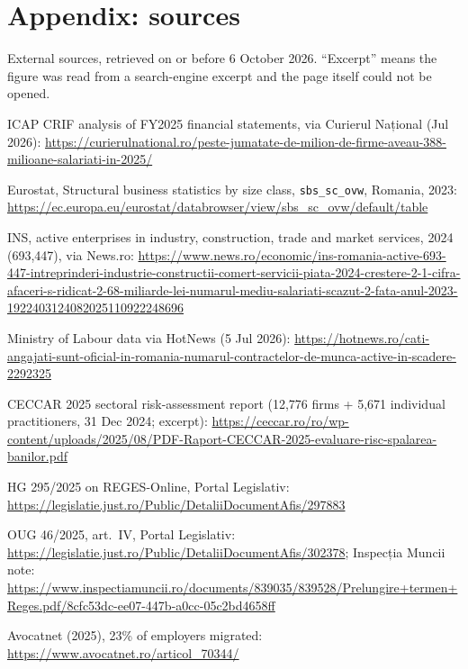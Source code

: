 \documentclass[10pt,a4paper]{article}
\begin{document}
\appendix
\section*{Appendix: sources}

{\scriptsize
External sources, retrieved on or before 6 October 2026. ``Excerpt'' means the figure was read from a
search-engine excerpt and the page itself could not be opened.

\begin{enumerate}[label={[\arabic*]},leftmargin=2.2em,itemsep=1.5pt]
\item ICAP CRIF analysis of FY2025 financial statements, via Curierul Național (Jul 2026): \url{https://curierulnational.ro/peste-jumatate-de-milion-de-firme-aveau-388-milioane-salariati-in-2025/}
\item Eurostat, Structural business statistics by size class, \texttt{sbs\_sc\_ovw}, Romania, 2023: \url{https://ec.europa.eu/eurostat/databrowser/view/sbs_sc_ovw/default/table}
\item INS, active enterprises in industry, construction, trade and market services, 2024 (693,447), via News.ro: \url{https://www.news.ro/economic/ins-romania-active-693-447-intreprinderi-industrie-constructii-comert-servicii-piata-2024-crestere-2-1-cifra-afaceri-s-ridicat-2-68-miliarde-lei-numarul-mediu-salariati-scazut-2-fata-anul-2023-1922403124082025110922248696}
\item Ministry of Labour data via HotNews (5 Jul 2026): \url{https://hotnews.ro/cati-angajati-sunt-oficial-in-romania-numarul-contractelor-de-munca-active-in-scadere-2292325}
\item CECCAR 2025 sectoral risk-assessment report (12,776 firms + 5,671 individual practitioners, 31 Dec 2024; excerpt): \url{https://ceccar.ro/ro/wp-content/uploads/2025/08/PDF-Raport-CECCAR-2025-evaluare-risc-spalarea-banilor.pdf}
\item HG 295/2025 on REGES-Online, Portal Legislativ: \url{https://legislatie.just.ro/Public/DetaliiDocumentAfis/297883}
\item OUG 46/2025, art.~IV, Portal Legislativ: \url{https://legislatie.just.ro/Public/DetaliiDocumentAfis/302378}; Inspecția Muncii note: \url{https://www.inspectiamuncii.ro/documents/839035/839528/Prelungire+termen+Reges.pdf/8cfc53dc-ee07-447b-a0cc-05c2bd4658ff}
\item Avocatnet (2025), 23\% of employers migrated: \url{https://www.avocatnet.ro/articol_70344/}

\end{enumerate}}
\end{document}
